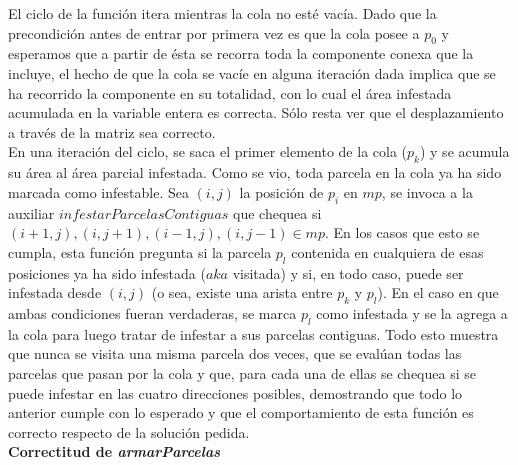 \indent El ciclo de la función itera mientras la cola no esté vacía. Dado que la precondición antes de entrar por primera vez es que la cola posee a $p_{0}$ y esperamos que a partir de ésta se recorra toda la componente conexa que la incluye, el hecho de que la cola se vacíe en alguna iteración dada implica que se ha recorrido la componente en su totalidad, con lo cual el área infestada acumulada en la variable entera es correcta. Sólo resta ver que el desplazamiento a través de la matriz sea correcto.\\
\indent En una iteración del ciclo, se saca el primer elemento de la cola ($p_{k}$) y se acumula su área al área parcial infestada. Como se vio, toda parcela en la cola ya ha sido marcada como infestable. Sea $(i,j)$ la posición de $p_{i}$ en $mp$, se invoca a la auxiliar $infestarParcelasContiguas$ que chequea si $(i+1,j), (i,j+1), (i-1,j),(i,j-1) \in mp$. En los casos que esto se cumpla, esta función pregunta si la parcela $p_{l}$ contenida en cualquiera de esas posiciones ya ha sido infestada ($aka$ visitada) y si, en todo caso, puede ser infestada desde $(i,j)$ (o sea, existe una arista entre $p_{k}$ y $p_{l}$). En el caso en que ambas condiciones fueran verdaderas, se marca $p_{l}$ como infestada y se la agrega a la cola para luego tratar de infestar a sus parcelas contiguas. Todo esto muestra que nunca se visita una misma parcela dos veces, que se evalúan todas las parcelas que pasan por la cola y que, para cada una de ellas se chequea si se puede infestar en las cuatro direcciones posibles, demostrando que todo lo anterior cumple con lo esperado y que el comportamiento de esta función es correcto respecto de la solución pedida. \\

\textbf{Correctitud de \textit{armarParcelas} }

